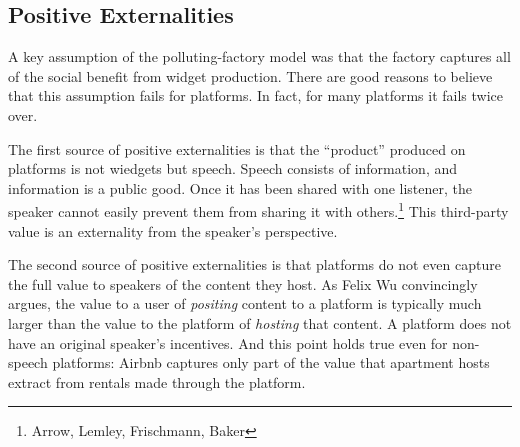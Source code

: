 \subsection{Positive Externalities}

A key assumption of the polluting-factory model was that the factory captures all of the social benefit from widget production. There are good reasons to believe that this assumption fails for platforms. In fact, for many platforms it fails twice over.

The first source of positive externalities is that the ``product'' produced on platforms is not wiedgets but speech. Speech consists of information, and information is a public good. Once it has been shared with one listener, the speaker cannot easily prevent them from sharing it with others.\footnote{Arrow, Lemley, Frischmann, Baker} This third-party value is an externality from the speaker's perspective.

The second source of positive externalities is that platforms do not even capture the full value to speakers of the content they host. As Felix Wu convincingly argues, the value to a user of \emph{positing} content to a platform is typically much larger than the value to the platform of \emph{hosting} that content. A platform does not have an original speaker's incentives. And this point holds true even for non-speech platforms: Airbnb captures only part of the value that apartment hosts extract from rentals made through the platform.

